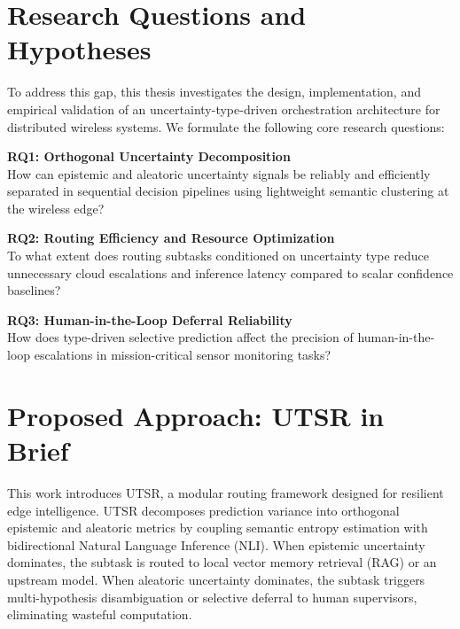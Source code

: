 \section{Research Questions and Hypotheses}
\label{sec:intro_rqs}

To address this gap, this thesis investigates the design, implementation, and empirical validation of an uncertainty-type-driven orchestration architecture for distributed wireless systems. We formulate the following core research questions:

\begin{researchquestion}
\textbf{RQ1: Orthogonal Uncertainty Decomposition}\\
How can epistemic and aleatoric uncertainty signals be reliably and efficiently separated in sequential decision pipelines using lightweight semantic clustering at the wireless edge?
\end{researchquestion}

\begin{researchquestion}
\textbf{RQ2: Routing Efficiency and Resource Optimization}\\
To what extent does routing subtasks conditioned on uncertainty type reduce unnecessary cloud escalations and inference latency compared to scalar confidence baselines?
\end{researchquestion}

\begin{researchquestion}
\textbf{RQ3: Human-in-the-Loop Deferral Reliability}\\
How does type-driven selective prediction affect the precision of human-in-the-loop escalations in mission-critical sensor monitoring tasks?
\end{researchquestion}

\section{Proposed Approach: UTSR in Brief}
\label{sec:intro_approach}

This work introduces \ac{UTSR}, a modular routing framework designed for resilient edge intelligence. \ac{UTSR} decomposes prediction variance into orthogonal epistemic and aleatoric metrics by coupling semantic entropy estimation with bidirectional Natural Language Inference (\ac{NLI}). When epistemic uncertainty dominates, the subtask is routed to local vector memory retrieval (\ac{RAG}) or an upstream model. When aleatoric uncertainty dominates, the subtask triggers multi-hypothesis disambiguation or selective deferral to human supervisors, eliminating wasteful computation.

